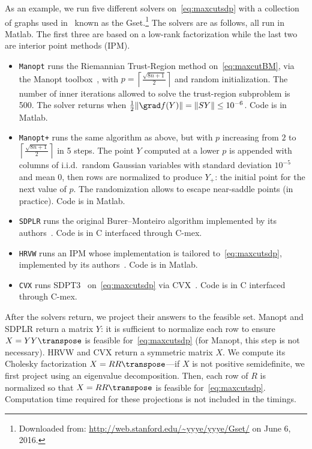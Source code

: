 \documentclass{article}
\newcommand{\1}{\mathbf{1}}
\begin{document}
As an example, we run five different solvers on~\eqref{eq:maxcutsdp} with a collection of graphs used in~\citep{sdplr,burer2005local} known as the Gset.\footnote{Downloaded from: \url{http://web.stanford.edu/~yyye/yyye/Gset/} on June 6, 2016.} The solvers are as follows, all run in Matlab. The first three are based on a low-rank factorization while the last two are interior point methods (IPM).
\begin{itemize}
	\item[] \texttt{Manopt} runs the Riemannian Trust-Region method on~\eqref{eq:maxcutBM}, via the Manopt toolbox~\citep{manopt}, with $p = \left\lceil \frac{\sqrt{8n+1}}{2} \right\rceil$ and random initialization. The number of inner iterations allowed to solve the trust-region subproblem is 500. The solver returns when $\frac12 \|\grad f(Y)\| = \|SY\|\leq 10^{-6}$. Code is in Matlab.
	\item[] \texttt{Manopt+} runs the same algorithm as above, but with $p$ increasing from $2$ to $\left\lceil \frac{\sqrt{8n+1}}{2} \right\rceil$ in 5 steps. The point $Y$ computed at a lower $p$ is appended with columns of i.i.d.\ random Gaussian variables with standard deviation $10^{-5}$ and mean 0, then rows are normalized to produce $Y_+$: the initial point for the next value of $p$. The randomization allows to escape near-saddle points (in practice). Code is in Matlab.
	\item[] \texttt{SDPLR} runs the original Burer--Monteiro algorithm implemented by its authors~\citep{sdplr}. Code is in C interfaced through C-mex.
	\item[] \texttt{HRVW} runs an IPM whose implementation is tailored to~\eqref{eq:maxcutsdp}, implemented by its authors~\citep{helmberg1996ipmsdp}. Code is in Matlab.
	\item[] \texttt{CVX} runs SDPT3~\citep{sdpt3} on~\eqref{eq:maxcutsdp} via CVX~\citep{cvx}. Code is in C interfaced through C-mex.
\end{itemize}
After the solvers return, we project their answers to the feasible set. Manopt and SDPLR return a matrix $Y$: it is sufficient to normalize each row to ensure $X = YY\transpose$ is feasible for~\eqref{eq:maxcutsdp} (for Manopt, this step is not necessary). HRVW and CVX return a symmetric matrix $X$. We compute its Cholesky factorization $X = RR\transpose$---if $X$ is not positive semidefinite, we first project using an eigenvalue decomposition. Then, each row of $R$ is normalized so that $X = RR\transpose$ is feasible for~\eqref{eq:maxcutsdp}. Computation time required for these projections is not included in the timings.
\end{document}
